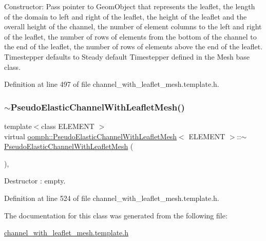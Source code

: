 Constructor\+: Pass pointer to Geom\+Object that represents the leaflet, the length of the domain to left and right of the leaflet, the height of the leaflet and the overall height of the channel, the number of element columns to the left and right of the leaflet, the number of rows of elements from the bottom of the channel to the end of the leaflet, the number of rows of elements above the end of the leaflet. Timestepper defaults to Steady default Timestepper defined in the Mesh base class. 



Definition at line 497 of file channel\+\_\+with\+\_\+leaflet\+\_\+mesh.\+template.\+h.

\mbox{\label{classoomph_1_1PseudoElasticChannelWithLeafletMesh_aaf0a9484052254d5840b4cde85a10a75}} 
\subsubsection{\texorpdfstring{$\sim$\+Pseudo\+Elastic\+Channel\+With\+Leaflet\+Mesh()}{~PseudoElasticChannelWithLeafletMesh()}}
{\footnotesize\ttfamily template$<$class E\+L\+E\+M\+E\+NT $>$ \\
virtual \hyperlink{classoomph_1_1PseudoElasticChannelWithLeafletMesh}{oomph\+::\+Pseudo\+Elastic\+Channel\+With\+Leaflet\+Mesh}$<$ E\+L\+E\+M\+E\+NT $>$\+::$\sim$\hyperlink{classoomph_1_1PseudoElasticChannelWithLeafletMesh}{Pseudo\+Elastic\+Channel\+With\+Leaflet\+Mesh} (\begin{DoxyParamCaption}{ }\end{DoxyParamCaption})\hspace{0.3cm}{\ttfamily [inline]}, {\ttfamily [virtual]}}



Destructor \+: empty. 



Definition at line 524 of file channel\+\_\+with\+\_\+leaflet\+\_\+mesh.\+template.\+h.



The documentation for this class was generated from the following file\+:\begin{DoxyCompactItemize}
\item 
\hyperlink{channel__with__leaflet__mesh_8template_8h}{channel\+\_\+with\+\_\+leaflet\+\_\+mesh.\+template.\+h}\end{DoxyCompactItemize}
